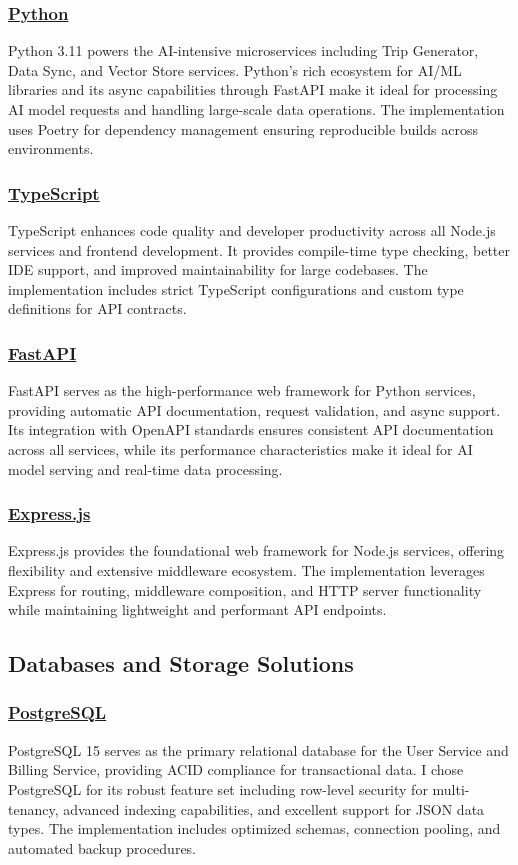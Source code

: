 \subsubsection*{\underline{Python}}
Python 3.11 powers the AI-intensive microservices including Trip Generator, Data Sync, and Vector Store services. Python's rich ecosystem for AI/ML libraries and its async capabilities through FastAPI make it ideal for processing AI model requests and handling large-scale data operations. The implementation uses Poetry for dependency management ensuring reproducible builds across environments.

\subsubsection*{\underline{TypeScript}}
TypeScript enhances code quality and developer productivity across all Node.js services and frontend development. It provides compile-time type checking, better IDE support, and improved maintainability for large codebases. The implementation includes strict TypeScript configurations and custom type definitions for API contracts.

\subsubsection*{\underline{FastAPI}}
FastAPI serves as the high-performance web framework for Python services, providing automatic API documentation, request validation, and async support. Its integration with OpenAPI standards ensures consistent API documentation across all services, while its performance characteristics make it ideal for AI model serving and real-time data processing.

\subsubsection*{\underline{Express.js}}
Express.js provides the foundational web framework for Node.js services, offering flexibility and extensive middleware ecosystem. The implementation leverages Express for routing, middleware composition, and HTTP server functionality while maintaining lightweight and performant API endpoints.

\subsection{Databases and Storage Solutions}

\subsubsection*{\underline{PostgreSQL}}
PostgreSQL 15 serves as the primary relational database for the User Service and Billing Service, providing ACID compliance for transactional data. I chose PostgreSQL for its robust feature set including row-level security for multi-tenancy, advanced indexing capabilities, and excellent support for JSON data types. The implementation includes optimized schemas, connection pooling, and automated backup procedures.

